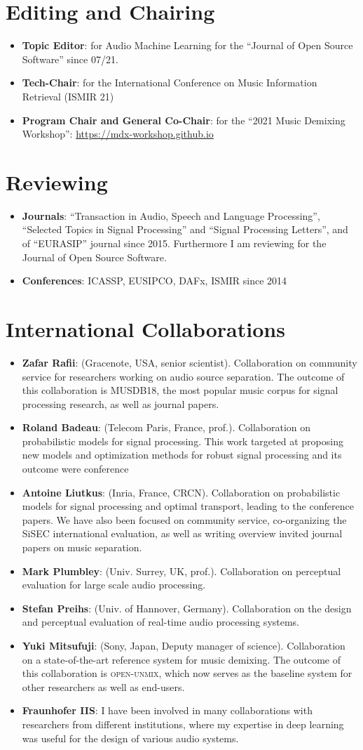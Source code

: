 \documentclass[a4paper,11pt]{article}
\newcommand{\resumeItem}[2]{
  \item\small{
    \textbf{#1}{: #2 \vspace{-2pt}}
  }
}
\newcommand{\resumeSubItem}[2]{\resumeItem{#1}{#2}\vspace{-4pt}}
\newcommand{\resumeSubHeadingListStart}{\begin{itemize}[leftmargin=*]}
\newcommand{\resumeSubHeadingListEnd}{\end{itemize}}
\begin{document}
\section{Editing and Chairing}
\resumeSubHeadingListStart  
\resumeSubItem{Topic Editor}{for Audio Machine Learning for the  ``Journal of Open Source Software'' since 07/21.}
  \resumeSubItem{Tech-Chair}{for the International Conference on Music Information Retrieval (ISMIR 21)}
  \resumeSubItem{Program Chair and General Co-Chair}{for the ``2021 Music Demixing Workshop'': \url{https://mdx-workshop.github.io}}
\resumeSubHeadingListEnd

\section{Reviewing}
\resumeSubHeadingListStart
  \resumeSubItem{Journals}{``Transaction in Audio, Speech and Language Processing'', ``Selected Topics in Signal Processing'' and ``Signal Processing Letters'', and of ``EURASIP'' journal since 2015. Furthermore I am reviewing for the Journal of Open Source Software.}
  \resumeSubItem{Conferences}{ICASSP, EUSIPCO, DAFx, ISMIR since 2014}
\resumeSubHeadingListEnd

\section{International Collaborations}
\resumeSubHeadingListStart
  \resumeSubItem{Zafar Rafii}{(Gracenote, USA, senior scientist). Collaboration on community service for researchers working on audio source separation. The outcome of this collaboration is \textsc{MUSDB18}, the most popular music corpus for signal processing research, as well as journal papers.}
  \resumeSubItem{Roland Badeau}{(Telecom Paris, France, prof.). Collaboration on probabilistic models for signal processing. This work targeted at proposing new models and optimization methods for robust signal processing and its outcome were conference}
  \resumeSubItem{Antoine Liutkus}{(Inria, France, CRCN). Collaboration on probabilistic models for signal processing and optimal transport, leading to the conference papers. We have also been focused on community service, co-organizing the SiSEC international evaluation, as well as writing overview invited journal papers on music separation.}
  \resumeSubItem{Mark Plumbley}{(Univ. Surrey, UK, prof.). Collaboration on perceptual evaluation for large scale audio processing.}
  \resumeSubItem{Stefan Preihs}{(Univ. of Hannover, Germany). Collaboration on the design and perceptual evaluation of real-time audio processing systems.}
  \resumeSubItem{Yuki Mitsufuji}{(Sony, Japan, Deputy manager of science). Collaboration on a state-of-the-art reference system for music demixing. The outcome of this collaboration is \textsc{open-unmix}, which now serves as the baseline system for other researchers as well as end-users.}
  \resumeSubItem{Fraunhofer IIS}{ I have been involved in many collaborations with researchers from different institutions, where my expertise in deep learning was useful for the design of various audio systems.}
\resumeSubHeadingListEnd
\end{document}
